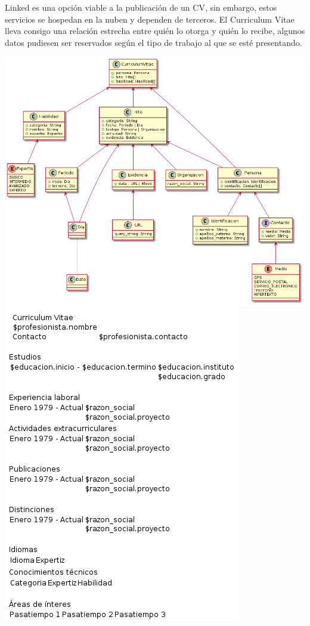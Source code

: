 \documentclass[conference]{IEEEtran}
\begin{document}
    Linked es una opción viable a la publicación de un CV, sin embargo, estos servicios se hospedan en la nuben y dependen de terceros. El Curriculum Vitae lleva consigo una relación estrecha entre quién lo otorga y quién lo recibe, algunos datos pudiesen ser reservados según el tipo de trabajo al que se esté presentando.

    \includegraphics[width=\linewidth]{../arc/images/curriculum-vitae-class-diagram.png}
    \includegraphics[width=\linewidth]{../arc/images/landing.png}
\end{document}
